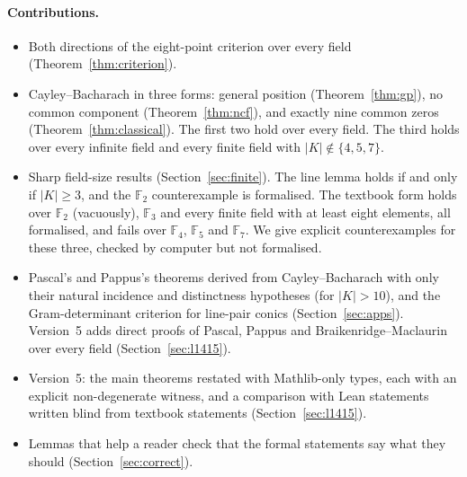 \documentclass[11pt]{article}
\theoremstyle{definition}
\theoremstyle{remark}
\newcommand{\F}{\mathbb{F}}
\begin{document}
\paragraph{Contributions.}
\begin{itemize}
\item Both directions of the eight-point criterion over every field
(Theorem~\ref{thm:criterion}).
\item Cayley--Bacharach in three forms: general position (Theorem~\ref{thm:gp}), no common
component (Theorem~\ref{thm:ncf}), and exactly nine common zeros (Theorem~\ref{thm:classical}).
The first two hold over every field. The third holds over every infinite field and every finite
field with $|K|\notin\{4,5,7\}$.
\item Sharp field-size results (Section~\ref{sec:finite}). The line lemma holds if and only if
$|K|\ge3$, and the $\F_2$ counterexample is formalised. The textbook form holds over $\F_2$ (vacuously), $\F_3$ and every
finite field with at least eight elements, all formalised, and fails over $\F_4$, $\F_5$ and
$\F_7$. We give explicit counterexamples for these three, checked by computer but not formalised.
\item Pascal's and Pappus's theorems derived from Cayley--Bacharach with only their natural
incidence and distinctness hypotheses (for $|K|>10$), and the Gram-determinant criterion for line-pair conics (Section~\ref{sec:apps}).
Version~5 adds direct proofs of Pascal, Pappus and Braikenridge--Maclaurin over every field
(Section~\ref{sec:l1415}).
\item Version~5: the main theorems restated with Mathlib-only types, each with an explicit
non-degenerate witness, and a comparison with Lean statements written blind from textbook statements
(Section~\ref{sec:l1415}).
\item Lemmas that help a reader check that the formal statements say what they should
(Section~\ref{sec:correct}).
\end{itemize}
\end{document}
